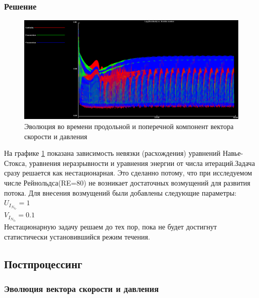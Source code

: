 \documentclass[12pt, a4paper]{article}
\begin{document}
\subsubsection{Решение}
\begin{figure}[H]
    \centering
    \includegraphics[scale=0.4]{figure/flos_t0.png}
    \caption{Эволюция во времени продольной и поперечной компонент вектора скорости и давления}
    \label{fig:my_labe3}
\end{figure}
На графике \ref{fig:my_labe3} показана зависимость невязки (расхождения) уравнений Навье-Стокса, уравнения неразрывности и уравнения энергии от числа итераций.Задача сразу решается как нестационарная. Это сделанно потому, что при исследуемом числе Рейнольдса(RE=80) не возникает достаточных возмущений для развития потока. Для внесения возмущений были добавлены следующие параметры: \\
$U_I_N_I_T = 1$  \\
$V_I_N_I_T = 0.1$  \\
 Нестационарную задачу решаем до тех пор, пока не будет достигнут статистически установившийся режим течения.

\subsection{Постпроцессинг}
\subsubsection{Эволюция вектора скорости и давления}
\end{document}
